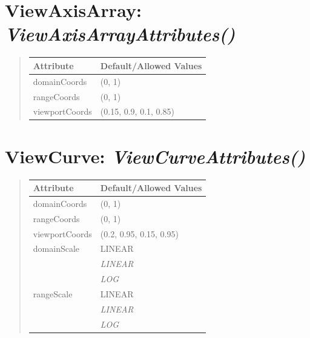 \documentclass[letterpaper,10pt,english]{sphinxmanual}
\begin{document}
\section{\textbf{ViewAxisArray}: \emph{ViewAxisArrayAttributes()}}
\label{attributes:viewaxisarray-viewaxisarrayattributes}
\begin{DUlineblock}{0em}
\item[] 
\end{DUlineblock}
\begin{quote}

\begin{tabulary}{\linewidth}{|L|L|}
\hline

\textbf{Attribute}
 & 
\textbf{Default/Allowed Values}
\\
\hline
domainCoords
 & 
(0, 1)
\\
\hline
rangeCoords
 & 
(0, 1)
\\
\hline
viewportCoords
 & 
(0.15, 0.9, 0.1, 0.85)
\\
\hline\end{tabulary}

\end{quote}

\begin{DUlineblock}{0em}
\item[] 
\end{DUlineblock}

\begin{DUlineblock}{0em}
\item[] 
\end{DUlineblock}


\section{\textbf{ViewCurve}: \emph{ViewCurveAttributes()}}
\label{attributes:viewcurve-viewcurveattributes}
\begin{DUlineblock}{0em}
\item[] 
\end{DUlineblock}
\begin{quote}

\begin{tabulary}{\linewidth}{|L|L|}
\hline

\textbf{Attribute}
 & 
\textbf{Default/Allowed Values}
\\
\hline
domainCoords
 & 
(0, 1)
\\
\hline
rangeCoords
 & 
(0, 1)
\\
\hline
viewportCoords
 & 
(0.2, 0.95, 0.15, 0.95)
\\
\hline
domainScale
 & 
LINEAR
\\
\hline & 
\emph{LINEAR}
\\
\hline & 
\emph{LOG}
\\
\hline
rangeScale
 & 
LINEAR
\\
\hline & 
\emph{LINEAR}
\\
\hline & 
\emph{LOG}
\\
\hline\end{tabulary}

\end{quote}
\end{document}
